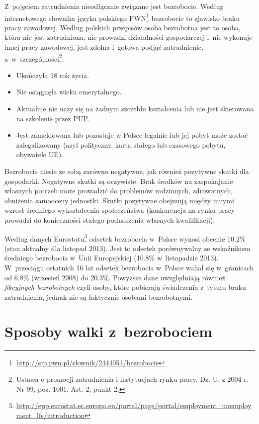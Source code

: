 \documentclass[12pt]{article}
\begin{document}
    Z~pojęciem zatrudnienia nieodłącznie związane jest bezrobocie. Według internetowego słownika języka polskiego PWN\footnote{\url{http://sjp.pwn.pl/slownik/2444051/bezrobocie}} bezrobocie to zjawisko braku pracy zawodowej. Według polskich przepisów osoba bezrobotna jest to osoba, która nie jest zatrudniona, nie prowadzi działalności gospodarczej i~nie wykonuje innej pracy zawodowej, jest zdolna i~gotowa podjąć zatrudnienie, a~w~szczególności\footnote{Ustawa o promocji zatrudnienia i instytucjach rynku pracy. Dz. U. z 2004 r. Nr 99, poz. 1001, Art. 2, punkt 2.}:
    
    \begin{itemize}
        \item Ukończyła 18 rok życia.
        \item Nie osiągnęła wieku emerytalnego.
        \item Aktualnie nie uczy się na żadnym szczeblu kształcenia lub nie jest skierowana na szkolenie przez PUP.
        \item Jest zameldowana lub pozostaje w Polsce legalnie lub jej pobyt może zostać zalegalizowany (azyl polityczny, karta stałego lub czasowego pobytu, obywatele UE).
    \end{itemize}
    
    Bezrobocie niesie ze sobą zarówno negatywne, jak również pozytywne skutki dla gospodarki. Negatywne skutki są oczywiste. Brak środków na zaspokajanie własnych potrzeb może prowadzić do problemów rodzinnych, zdrowotnych, obniżenia samooceny jednostki. Skutki pozytywne obejmują między innymi wzrost średniego wykształcenia społeczeństwa (konkurencja na rynku pracy prowadzi do konieczności stałego podnoszenia własnych kwalifikacji).
    
    Według danych Eurostatu\footnote{\url{http://epp.eurostat.ec.europa.eu/portal/page/portal/employment_unemployment_lfs/introduction}} odsetek bezrobocia w~Polsce wynosi obecnie 10.2\% (stan aktualny dla listopad 2013). Jest to odsetek porównywalny ze wskaźnikiem średniego bezrobocia w~Unii Europejskiej (10.8\% w~listopadzie 2013). W~przeciągu ostatnich 16 lat odsetek bezrobocia w~Polsce wahał się w~granicach od 6.8\% (wrzesień 2008) do 20.3\%. Powyższe dane uwzględniają również \emph{fikcyjnych bezrobotnych} czyli osoby, które pobierają świadczenia z~tytułu braku zatrudnienia, jednak nie są faktycznie osobami bezrobotnymi.
    
    \section*{Sposoby walki z~bezrobociem}
    
\end{document}

